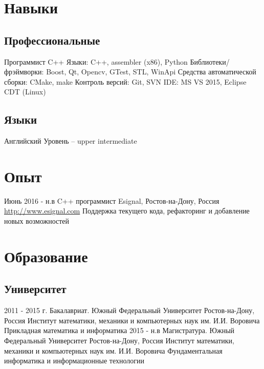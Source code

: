 \documentclass[11pt,a4paper]{moderncv}
\begin{document}
\maketitle

\section{Навыки}
  \subsection{Профессиональные}
    \cvline
    {Программист C++}
      {
      Языки: C++, assembler (x86), Python\newline{}
      Библиотеки/фрэймворки: Boost, Qt, Opencv, GTest, STL, WinApi \newline{}
      Средства автоматической сборки: CMake, make \newline{}
      Контроль версий: Git, SVN \newline{}
      IDE: MS VS 2015, Eclipse CDT (Linux)
      }
  \subsection{Языки}
    \cvline
    {Английский}
      {
      Уровень -- upper intermediate \newline{}
      }

\section{Опыт}
\cventry
  {Июнь 2016 - н.в}
  {C++ программист}
  {Esignal, Ростов-на-Дону, Россия}
  {\newline{}\url{http://www.esignal.com}}{}
  {Поддержка текущего кода, рефакторинг и добавление новых возможностей}

\section{Образование}
  \subsection{Университет}
    \cventry
      {2011 - 2015 г.}
      {Бакалавриат. Южный Федеральный Университет}
      {Ростов-на-Дону, Россия}
      {Институт математики, механики и компьютерных наук им. И.И. Воровича}
      {Прикладная математика и информатика}
      {}
    \cventry
      {2015 - н.в}
      {Магистратура. Южный Федеральный Университет}
      {Ростов-на-Дону, Россия}
      {Институт математики, механики и компьютерных наук им. И.И. Воровича}
      {Фундаментальная информатика и информационные технологии}
      {}
\end{document}
